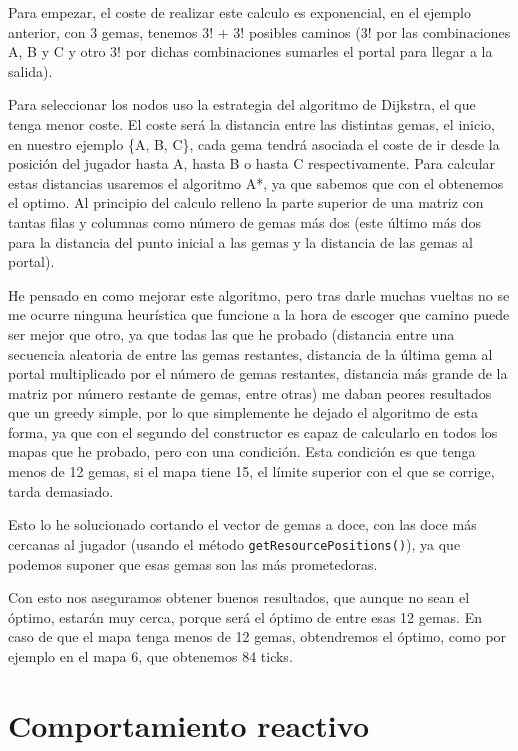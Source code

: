 \documentclass[10pt, spanish]{article}
\begin{document}
Para empezar, el coste de realizar este calculo es exponencial, en el ejemplo anterior, con 3 gemas, tenemos 3! + 3! posibles caminos (3! por las combinaciones A, B y C y otro 3! por dichas combinaciones sumarles el portal para llegar a la salida).

Para seleccionar los nodos uso la estrategia del algoritmo de Dijkstra, el que tenga menor coste. El coste será la distancia entre las distintas gemas, el inicio, en nuestro ejemplo \{A, B, C\}, cada gema tendrá asociada el coste de ir desde la posición del jugador hasta A, hasta B o hasta C respectivamente. Para calcular estas distancias usaremos el algoritmo A*, ya que sabemos que con el obtenemos el optimo. Al principio del calculo relleno la parte superior de una matriz con tantas filas y columnas como número de gemas más dos (este último más dos para la distancia del punto inicial a las gemas y la distancia de las gemas al portal).

He pensado en como mejorar este algoritmo, pero tras darle muchas vueltas no se me ocurre ninguna heurística que funcione a la hora de escoger que camino puede ser mejor que otro, ya que todas las que he probado (distancia entre una secuencia aleatoria de entre las gemas restantes, distancia de la última gema al portal multiplicado por el número de gemas restantes, distancia más grande de la matriz por número restante de gemas, entre otras) me daban peores resultados que un greedy simple, por lo que simplemente he dejado el algoritmo de esta forma, ya que con el segundo del constructor es capaz de calcularlo en todos los mapas que he probado, pero con una condición. Esta condición es que tenga menos de 12 gemas, si el mapa tiene 15, el límite superior con el que se corrige, tarda demasiado.

Esto lo he solucionado cortando el vector de gemas a doce, con las doce más cercanas al jugador (usando el método \texttt{getResourcePositions()}), ya que podemos suponer que esas gemas son las más prometedoras.

Con esto nos aseguramos obtener buenos resultados, que aunque no sean el óptimo, estarán muy cerca, porque será el óptimo de entre esas 12 gemas. En caso de que el mapa tenga menos de 12 gemas, obtendremos el óptimo, como por ejemplo en el mapa 6, que obtenemos 84 ticks.

\section{Comportamiento reactivo}
\end{document}
